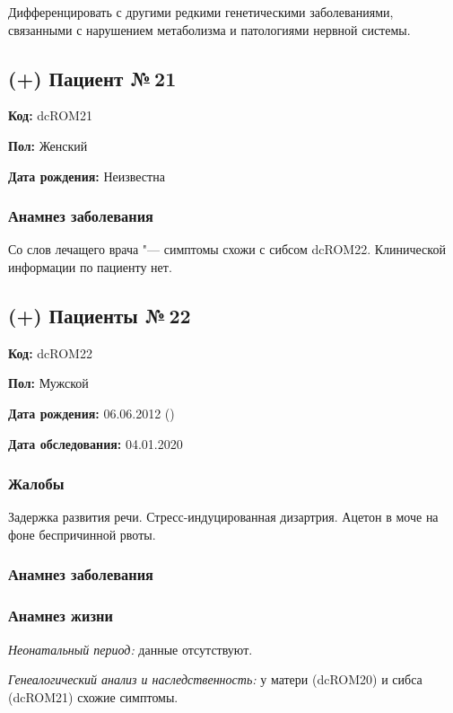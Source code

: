\documentclass[a4paper,14pt]{extarticle}
\begin{document}
Дифференцировать с другими редкими генетическими заболеваниями, связанными с нарушением метаболизма и патологиями нервной системы.

\newpage
\subsection*{(+) Пациент №\,21}

\textbf{Код:} dcROM21

\textbf{Пол:} Женский

\textbf{Дата рождения:} Неизвестна

\subsubsection*{Анамнез заболевания}

Со слов лечащего врача "--- симптомы схожи с сибсом dcROM22.
Клинической информации по пациенту нет.

\newpage
\subsection*{(+) Пациенты №\,22}

\textbf{Код:} dcROM22

\textbf{Пол:} Мужской

\textbf{Дата рождения:} 06.06.2012 ()

\textbf{Дата обследования:} 04.01.2020

\subsubsection*{Жалобы}

Задержка развития речи.
Стресс-индуцированная дизартрия.
Ацетон в моче на фоне беспричинной рвоты.

\subsubsection*{Анамнез заболевания}

\subsubsection*{Анамнез жизни}

\emph{Неонатальный период:} данные отсутствуют.

\emph{Генеалогический анализ и наследственность:} у матери (dcROM20) и сибса (dcROM21) схожие симптомы.
\end{document}
